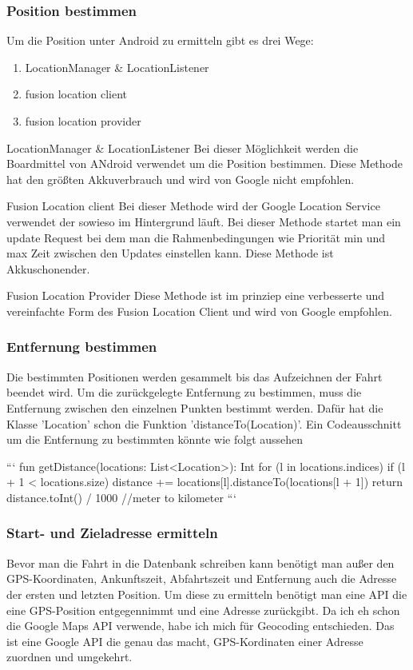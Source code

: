 \documentclass[a4paper]{article}
\begin{document}
\subsubsection{Position bestimmen}
Um die Position unter Android zu ermitteln gibt es drei Wege:
\begin{enumerate}
	\item  LocationManager & LocationListener
	\item fusion location client
	\item fusion location provider
\end{enumerate}

LocationManager & LocationListener
Bei dieser Möglichkeit werden die Boardmittel von ANdroid verwendet um die Position bestimmen.
Diese Methode hat den größten Akkuverbrauch und wird von Google nicht empfohlen.

Fusion Location client
Bei dieser Methode wird der Google Location Service verwendet der sowieso im Hintergrund läuft. Bei dieser Methode 
startet man ein update Request bei dem man die Rahmenbedingungen wie Priorität min und max Zeit zwischen den Updates einstellen kann.
Diese Methode ist Akkuschonender.

Fusion Location Provider
Diese Methode ist im prinziep eine verbesserte und vereinfachte Form des Fusion Location Client und wird von Google empfohlen.

\subsubsection{Entfernung bestimmen}
Die bestimmten Positionen werden gesammelt bis das Aufzeichnen der Fahrt beendet wird. 
Um die zurückgelegte Entfernung zu bestimmen, muss die Entfernung zwischen den einzelnen Punkten bestimmt werden.
Dafür hat die Klasse 'Location' schon die Funktion 'distanceTo(Location)'.
Ein Codeausschnitt um die Entfernung zu bestimmten könnte wie folgt aussehen

```
fun getDistance(locations: List<Location>): Int {
	for (l in locations.indices) {
		if (l + 1 < locations.size)
			distance += locations[l].distanceTo(locations[l + 1])
	}
	return distance.toInt() / 1000 //meter to kilometer
}
```

\subsubsection{Start- und Zieladresse ermitteln}
Bevor man die Fahrt in die Datenbank schreiben kann benötigt man außer den GPS-Koordinaten, Ankunftszeit, Abfahrtszeit und 
Entfernung auch die Adresse der ersten und letzten Position. Um diese zu ermitteln benötigt man eine API die eine GPS-Position 
entgegennimmt und eine Adresse zurückgibt. Da ich eh schon die Google Maps API verwende, habe ich mich für Geocoding entschieden.
Das ist eine Google API die genau das macht, GPS-Kordinaten einer Adresse zuordnen und umgekehrt. 
\end{document}
